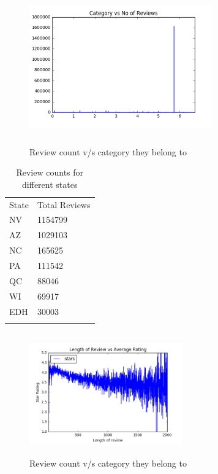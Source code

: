 \documentclass[paper=a4, fontsize=11pt]{scrartcl} %
\numberwithin{equation}{section} %
\numberwithin{figure}{section} %
\numberwithin{table}{section} %
\begin{document}
\begin{figure}[!htb]
\centering
\includegraphics[width=300px, height = 250px]{category_reviews.png}
\caption{Review count v/s category they belong to}
\label{category_reviews}
\end{figure} 

\begin{table}[!htb]
 \centering
 \caption{Review counts for different states}
 \label{state_review}
 \begin{tabular}{l l} 
    \noalign{\smallskip}\hline\noalign{\smallskip}
    State & Total Reviews \\
    \noalign{\smallskip}\hline\noalign{\smallskip}
NV & 1154799 \\
AZ & 1029103 \\
NC & 165625 \\
PA & 111542 \\
QC & 88046 \\
WI & 69917 \\
EDH & 30003 \\
    \noalign{\smallskip}\hline
  \end{tabular} 
\end{table}  

\begin{figure}[!htb]
\centering
\includegraphics[width=250px, height = 200px]{avg_count.png}
\caption{Review count v/s category they belong to}
\label{average_length}
\end{figure} 
\end{document}
